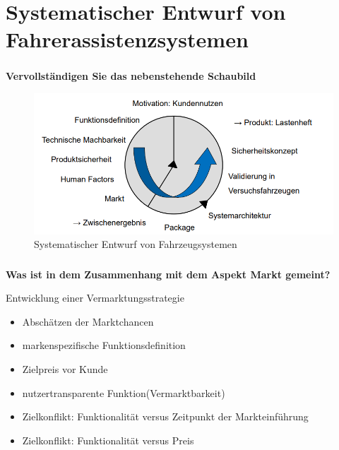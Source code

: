 \part{Systematischer Entwurf von Fahrerassistenzsystemen}
\section{}
\textbf{Vervollständigen Sie das nebenstehende Schaubild}
\begin{figure}[H]
    \centering
    \includegraphics[width=.8\linewidth]{Graphics/systematischer_Entwurf.png}
    \caption{Systematischer Entwurf von Fahrzeugsystemen}
\end{figure}
\section{}
\textbf{Was ist in dem Zusammenhang mit dem Aspekt Markt gemeint?}

Entwicklung einer Vermarktungsstrategie
\begin{itemize}
    \item Abschätzen der Marktchancen
    \item markenspezifische Funktionsdefinition
    \item Zielpreis vor Kunde
    \item nutzertransparente Funktion(Vermarktbarkeit)
    \item Zielkonflikt: Funktionalität versus Zeitpunkt der Markteinführung
    \item Zielkonflikt: Funktionalität versus Preis
\end{itemize}
